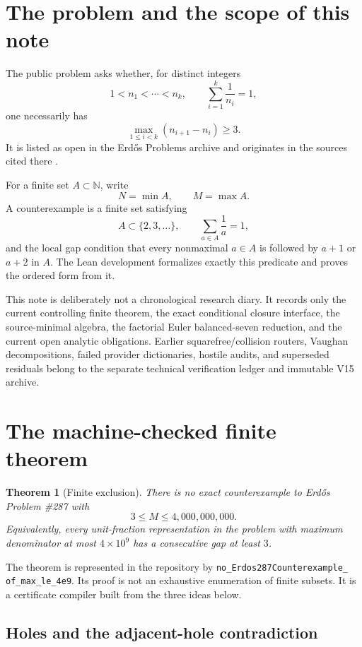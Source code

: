 \documentclass[11pt]{article}
\newtheorem{theorem}{Theorem}[section]
\theoremstyle{definition}
\newcommand{\N}{\mathbb N}
\newcommand{\1}{\mathbf 1}
\begin{document}
\tableofcontents

\section{The problem and the scope of this note}

The public problem asks whether, for distinct integers
\[
1<n_1<\cdots<n_k,\qquad \sum_{i=1}^k\frac1{n_i}=1,
\]
one necessarily has
\[
\max_{1\le i<k}(n_{i+1}-n_i)\ge3.
\]
It is listed as open in the Erd\H{o}s Problems archive and originates in the sources
cited there \cite{ErdosGraham1980,ErdosProblems287}.

For a finite set $A\subset\N$, write
\[
N=\min A,\qquad M=\max A.
\]
A counterexample is a finite set satisfying
\[
A\subset\{2,3,\dots\},\qquad \sum_{a\in A}\frac1a=1,
\]
and the local gap condition that every nonmaximal $a\in A$ is followed by $a+1$ or $a+2$
in $A$.  The Lean development formalizes exactly this predicate and proves the ordered
form from it.

This note is deliberately not a chronological research diary.  It records only the
current controlling finite theorem, the exact conditional closure interface, the
source-minimal algebra, the factorial Euler balanced-seven reduction, and the current open
analytic obligations.  Earlier squarefree/collision routers, Vaughan decompositions, failed
provider dictionaries, hostile audits, and superseded residuals belong to the separate technical
verification ledger and immutable V15 archive.

\section{The machine-checked finite theorem}

\begin{theorem}[Finite exclusion]
There is no exact counterexample to Erd\H{o}s Problem \#287 with
\[
3\le M\le4{,}000{,}000{,}000.
\]
Equivalently, every unit-fraction representation in the problem with maximum denominator
at most $4\times10^9$ has a consecutive gap at least $3$.
\end{theorem}

The theorem is represented in the repository by
\texttt{no\_Erdos287Counterexample\_}\\\texttt{of\_max\_le\_4e9}.  Its proof is not an exhaustive
enumeration of finite subsets.  It is a certificate compiler built from the three ideas
below.

\subsection{Holes and the adjacent-hole contradiction}
\end{document}
